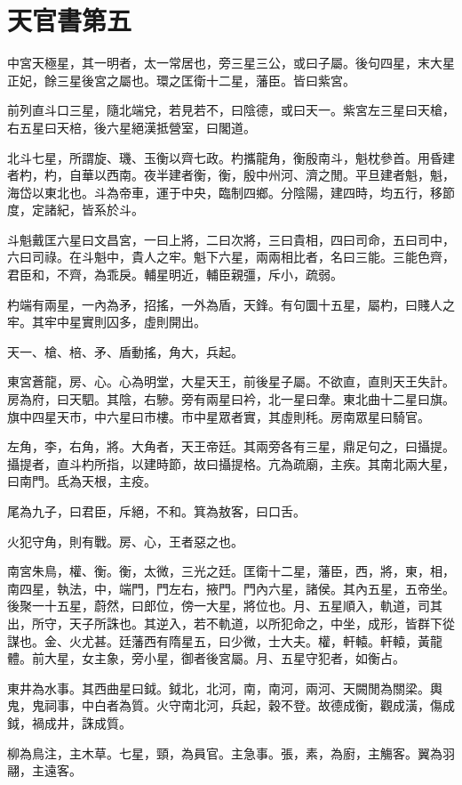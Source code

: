 \chapter{天官書第五}

中宮天極星，其一明者，太一常居也，旁三星三公，或曰子屬。後句四星，末大星正妃，餘三星後宮之屬也。環之匡衛十二星，藩臣。皆曰紫宮。

前列直斗口三星，隨北端兌，若見若不，曰陰德，或曰天一。紫宮左三星曰天槍，右五星曰天棓，後六星絕漢抵營室，曰閣道。

北斗七星，所謂旋、璣、玉衡以齊七政。杓攜龍角，衡殷南斗，魁枕參首。用昏建者杓，杓，自華以西南。夜半建者衡，衡，殷中州河、濟之閒。平旦建者魁，魁，海岱以東北也。斗為帝車，運于中央，臨制四鄉。分陰陽，建四時，均五行，移節度，定諸紀，皆系於斗。

斗魁戴匡六星曰文昌宮，一曰上將，二曰次將，三曰貴相，四曰司命，五曰司中，六曰司祿。在斗魁中，貴人之牢。魁下六星，兩兩相比者，名曰三能。三能色齊，君臣和，不齊，為乖戾。輔星明近，輔臣親彊，斥小，疏弱。

杓端有兩星，一內為矛，招搖，一外為盾，天鋒。有句圜十五星，屬杓，曰賤人之牢。其牢中星實則囚多，虛則開出。

天一、槍、棓、矛、盾動搖，角大，兵起。

東宮蒼龍，房、心。心為明堂，大星天王，前後星子屬。不欲直，直則天王失計。房為府，曰天駟。其陰，右驂。旁有兩星曰衿，北一星曰舝。東北曲十二星曰旗。旗中四星天市，中六星曰市樓。市中星眾者實，其虛則秏。房南眾星曰騎官。

左角，李，右角，將。大角者，天王帝廷。其兩旁各有三星，鼎足句之，曰攝提。攝提者，直斗杓所指，以建時節，故曰攝提格。亢為疏廟，主疾。其南北兩大星，曰南門。氐為天根，主疫。

尾為九子，曰君臣，斥絕，不和。箕為敖客，曰口舌。

火犯守角，則有戰。房、心，王者惡之也。

南宮朱鳥，權、衡。衡，太微，三光之廷。匡衛十二星，藩臣，西，將，東，相，南四星，執法，中，端門，門左右，掖門。門內六星，諸侯。其內五星，五帝坐。後聚一十五星，蔚然，曰郎位，傍一大星，將位也。月、五星順入，軌道，司其出，所守，天子所誅也。其逆入，若不軌道，以所犯命之，中坐，成形，皆群下從謀也。金、火尤甚。廷藩西有隋星五，曰少微，士大夫。權，軒轅。軒轅，黃龍體。前大星，女主象，旁小星，御者後宮屬。月、五星守犯者，如衡占。

東井為水事。其西曲星曰鉞。鉞北，北河，南，南河，兩河、天闕閒為關梁。輿鬼，鬼祠事，中白者為質。火守南北河，兵起，穀不登。故德成衡，觀成潢，傷成鉞，禍成井，誅成質。

柳為鳥注，主木草。七星，頸，為員官。主急事。張，素，為廚，主觴客。翼為羽翮，主遠客。

